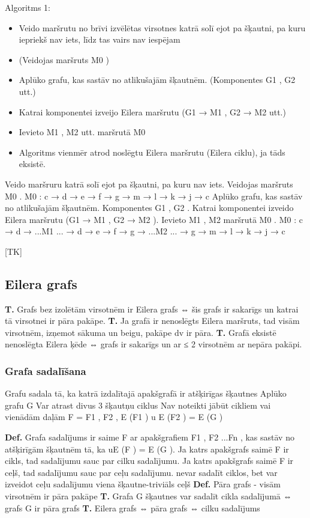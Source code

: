 \documentclass{article}
\begin{document}
Algoritms 1:
\begin{itemize}
	\item Veido maršrutu no brīvi izvēlētas virsotnes katrā solī ejot pa šķautni, pa kuru iepriekš nav iets, līdz tas vairs nav iespējam
	\item (Veidojas maršruts M0 )
	\item Aplūko grafu, kas sastāv no atlikušajām šķautnēm. (Komponentes G1 , G2 utt.)
	\item Katrai komponentei izveijo Eilera maršrutu (G1 → M1 , G2 → M2 utt.)
	\item Ievieto M1 , M2 utt. maršrutā M0
	\item Algoritms vienmēr atrod noslēgtu Eilera maršrutu (Eilera ciklu), ja tāds eksistē.
\end{itemize}
	
Veido maršruru katrā solī ejot pa šķautni, pa kuru nav iets. Veidojas maršruts M0 .
M0 : c → d → e → f → g → m → l → k → j → c Aplūko grafu, kas sastāv no atlikušajām šķautnēm. Komponentes G1 , G2 .  Katrai komponentei izveido Eilera maršrutu (G1 → M1 , G2 → M2 ).  Ievieto M1 , M2 maršrutā M0 .  M0 : c → d → ...M1 ... → d → e → f → g → ...M2 ... → g → m → l → k → j → c

[TK]

\subsection{Eilera grafs}

\textbf{T. } Grafs bez izolētām virsotnēm ir Eilera grafs ⇔ šis grafs ir sakarīgs un katrai tā virsotnei ir pāra pakāpe.
\textbf{T. } Ja grafā ir nenoslēgts Eilera maršruts, tad visām virsotnēm, izņemot sākuma un beigu, pakāpe dv ir pāra.
\textbf{T. } Grafā eksistē nenoslēgta Eilera ķēde ⇔ grafs ir sakarīgs un ar ≤ 2 virsotnēm ar nepāra pakāpi.

\subsubsection{Grafa sadalīšana}

Grafu sadala tā, ka katrā izdalītajā apakšgrafā ir atšķirīgas šķautnes Aplūko grafu G Var atrast divus 3 šķautņu ciklus Nav noteikti jābūt cikliem vai vienādām daļām
F = F1 , F2 , E (F1 ) u E (F2 ) = E (G )

\textbf{Def.}  Grafa sadalījums ir saime F ar apakšgrafiem F1 , F2 ...Fn , kas sastāv no atšķirīgām šķautnēm tā, ka uE (F ) = E (G ).  Ja katrs apakšgrafs saimē F ir cikls, tad sadalījumu sauc par cilku sadalījumu. Ja katrs apakšgrafs saimē F ir ceļš, tad sadalījumu sauc par ceļu sadalījumu.  nevar sadalīt ciklos, bet var izveidot ceļu sadalījumu viena šķautne-triviāls ceļš
\textbf{Def.}  Pāra grafs - visām virsotnēm ir pāra pakāpe
\textbf{T. } Grafa G šķautnes var sadalīt cikla sadalījumā ⇔ grafs G ir pāra grafs
\textbf{T. } Eilera grafs ⇔ pāra grafs ⇔ cilku sadalījums
\end{document}

